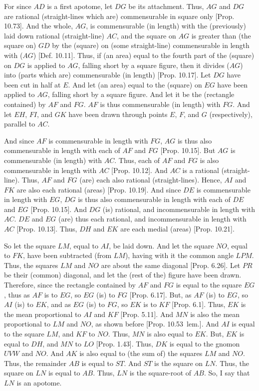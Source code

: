 \begin{Parallel}{}{}
{\epsfysize=1.3in
\centerline{}

For since $AD$ is a first apotome, let $DG$ be its attachment. Thus,
$AG$ and $DG$ are rational (straight-lines which are) commensurable in
square only [Prop. 10.73]. And the whole, $AG$,
is commensurable (in length) with the (previously) laid down rational (straight-line)
$AC$, and the square on $AG$ is greater than (the square on) $GD$
by the (square) on  (some straight-line) commensurable in length with ($AG$) [Def. 10.11]. Thus, if (an area) equal to the
fourth part of the (square) on $DG$ is applied to $AG$, falling short
by a square figure, then it divides ($AG$) into (parts which are) commensurable
(in length) [Prop. 10.17]. Let $DG$
have been cut in half at $E$. And let (an area) equal to the (square) on
$EG$ have been applied to $AG$, falling short by a square figure. And let
it be the (rectangle contained) by $AF$ and $FG$. $AF$ is
 thus commensurable (in length) with $FG$. And let $EH$, $FI$, and $GK$
have been drawn through points $E$, $F$, and $G$ (respectively),
parallel to $AC$.

And since $AF$ is commensurable in length with $FG$, $AG$ is thus also
commensurable in length with each of $AF$ and $FG$ [Prop. 10.15]. But $AG$ is commensurable (in length)
with $AC$. Thus, each of $AF$ and $FG$ is also commensurable in length with $AC$ 
[Prop. 10.12]. 
And $AC$ is a rational (straight-line). Thus,  $AF$ and $FG$ (are) each
also rational (straight-lines). Hence, $AI$ and
$FK$ are also each rational (areas) [Prop. 10.19]. And since $DE$ is commensurable
in length with $EG$, $DG$ is thus also commensurable
in length with each of $DE$ and $EG$ [Prop. 10.15]. And $DG$ (is) rational, and
incommensurable in length with $AC$. $DE$ and $EG$ (are) thus each
rational, and incommensurable in length with $AC$ [Prop. 10.13]. Thus, $DH$ and $EK$ are
each medial (areas) [Prop. 10.21].

So let the square $LM$, equal to $AI$, be laid down. And let the square $NO$,
equal to $FK$, have been
subtracted (from $LM$), having with it the common angle $LPM$. Thus,
the squares $LM$ and $NO$ are about the same diagonal [Prop. 6.26]. Let $PR$ be their (common) diagonal, and
let the (rest of the) figure have been drawn. Therefore, since
the rectangle contained by $AF$ and $FG$ is equal to the square $EG$,
thus as $AF$ is to $EG$, so $EG$ (is) to $FG$ [Prop. 6.17]. But, as $AF$ (is) to $EG$, so $AI$ (is)
to $EK$, and as $EG$ (is) to $FG$, so $EK$ is to $KF$ [Prop. 6.1]. Thus, $EK$ is the mean proportional
to $AI$ and $KF$ [Prop. 5.11]. And $MN$ is also the mean proportional to
$LM$ and $NO$, as shown before [Prop. 10.53~lem.].  And $AI$ is equal to the
square $LM$, and $KF$ to $NO$. Thus, $MN$ is also equal to $EK$.
But, $EK$ is equal to $DH$, and $MN$ to $LO$ [Prop. 1.43]. Thus, $DK$ is equal to the
gnomon $UVW$ and  $NO$. And $AK$ is also equal to 
(the sum of) the squares $LM$ and $NO$.  Thus, the remainder $AB$ is equal
to $ST$. And $ST$ is the square on $LN$. Thus, the square on $LN$
is equal to $AB$. Thus, $LN$ is the square-root of $AB$. So, I say that
$LN$ is an apotome.

}
\end{Parallel}
